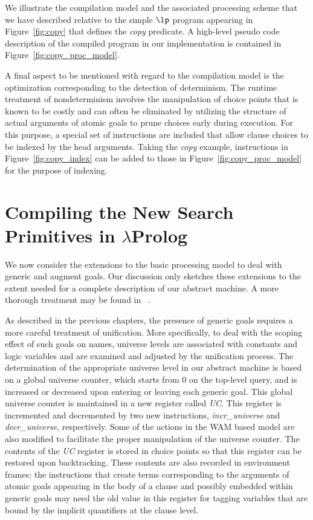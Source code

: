 We illustrate the compilation model and the associated processing
scheme that we have described relative to the simple $\lp$ program
appearing in Figure~\ref{fig:copy} that defines the {\it copy}
predicate. A high-level pseudo code description of the compiled
program in our implementation is contained in
Figure~\ref{fig:copy_proc_model}.

A final aspect to be mentioned with regard to the compilation model is
the optimization corresponding to the detection of determinism.
The runtime treatment of nondeterminism involves the manipulation of choice
points that is known to be costly and can often be eliminated by
utilizing the structure of actual arguments of atomic goals to prune choices
early during execution. For this purpose, a special set of instructions are
included that allow clause choices to be indexed by the head arguments.
Taking the {\it copy} example, instructions in Figure~\ref{fig:copy_index} can
be added to those in Figure~\ref{fig:copy_proc_model} for the purpose of
indexing.

\section{Compiling the New Search Primitives in $\lambda$Prolog}\label{sec:ho_control}
We now consider the extensions to the basic processing model to deal
with generic and augment goals. Our discussion only sketches these
extensions to the extent needed for a complete description of our
abstract machine. A more thorough treatment may be found in
~\cite{NJK95lp}.

As described in the previous chapters, the presence of generic goals
requires a more careful treatment of unification. More specifically,
to deal with the scoping effect of such goals on names, universe
levels are associated with constants and logic variables and are
examined and adjusted by the unification process. The determination of
the appropriate universe level in our abstract machine is based on a
global universe counter, which starts from $0$ on the top-level query,
and is increased or  decreased upon entering or leaving each generic
goal. This global universe counter is maintained in a new
register called {\it UC}. This register is incremented and decremented
by two new instructions, {\it incr\_universe} and {\it decr\_universe},
respectively.
Some of the actions in the WAM based model are also modified to
facilitate the proper manipulation of the universe counter.
The contents of the {\it UC} register is stored
in choice points so that this register can be restored upon
backtracking. These contents are also recorded in environment frames;
the instructions that create terms corresponding to the arguments of
atomic goals appearing in the body of a clause and possibly embedded
within generic goals may need the old value in this register for
tagging variables that are bound by the implicit quantifiers at the
clause level.

